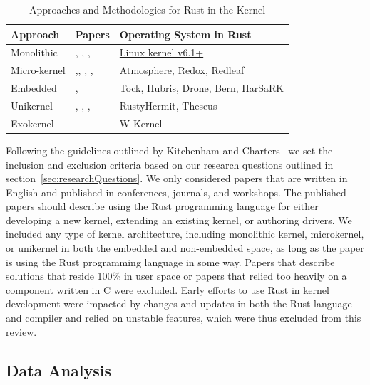 \documentclass[sigconf]{acmart}
\begin{document}
\begin{table}
    \begin{tabular}{||l|l|l||}
    \hline
    Approach & Papers & Operating System in Rust\\
    \hline\hline
    Monolithic  & \cite{The_kernel_development_community_undated-iw}, \cite{Li2019-ru}, \cite{Miller2021-pg}, \cite{Oikawa2023-ms} & \href{https://docs.kernel.org/rust/}{Linux kernel v6.1+}\\
    Micro-kernel & \cite{Chen2023-wb},\cite{Liang2021-bo}, \cite{Liu2024-xe}, \cite{Narayanan2020-gs}, \cite{Narayanan2019-fd} & Atmosphere, Redox, Redleaf\\
    Embedded & \cite{Culic2022-bk}, \cite{Vishnunaryan2022-yd} & \href{https://github.com/tock/tock}{Tock}, \href{https://hubris.oxide.computer/}{Hubris}, \href{https://www.drone-os.com/}{Drone}, \href{https://bern-rtos.org/}{Bern}, HarSaRK \\
    Unikernel & \cite{Lankes2019-cm},  \cite{Boos2020-zh}, \cite{Ijaz2023-da}, \cite{Sung2020-bb}  & RustyHermit, Theseus \\
    Exokernel & \cite{Li2024-yb} & W-Kernel \\
    \hline
  \end{tabular}
  \caption{Approaches and Methodologies for Rust in the Kernel}
    \label{tab:RQ1}
\end{table}

Following the guidelines outlined by Kitchenham and Charters~\cite{Stuart2007-cc} we set the
inclusion and exclusion criteria based on our research questions outlined in
section~\ref{sec:researchQuestions}. We only considered papers that are written in English and published
in conferences, journals, and workshops. The published papers should
describe using the Rust programming language for either developing a new kernel, extending an
existing kernel, or authoring drivers. We included any type of kernel architecture, including
monolithic kernel, microkernel, or unikernel in both the embedded and non-embedded space, as long as
the paper is using the Rust programming language in some way. Papers that describe solutions that
reside 100\% in user space or papers that relied too heavily on a component written in C were excluded. Early efforts to use Rust in kernel development
were impacted by changes and updates in both the Rust language and compiler and relied on unstable
features, which were thus excluded from this review.

\subsection{Data Analysis}
\end{document}

